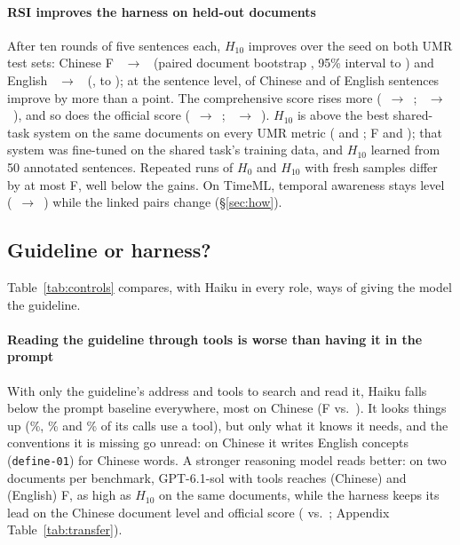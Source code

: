 \paragraph{RSI improves the harness on held-out documents} After ten rounds of five sentences each, $H_{10}$ improves over the seed on both UMR test sets: Chinese F \mainSeedZh{}~$\rightarrow$~\mainLearnedZh{} (paired document bootstrap \gainLearnedZh{}, 95\% interval \gainLearnedZhLo{} to \gainLearnedZhHi{}) and English \mainSeedEn{}~$\rightarrow$~\mainLearnedEn{} (\gainLearnedEn{}, \gainLearnedEnLo{} to \gainLearnedEnHi{}); at the sentence level, \sentLearnedZhBetter{} of \sentLearnedZhN{} Chinese and \sentLearnedEnBetter{} of \sentLearnedEnN{} English sentences improve by more than a point. The comprehensive score rises more (\compSeedZh{}~$\rightarrow$~\compLearnedZh{}; \compSeedEn{}~$\rightarrow$~\compLearnedEn{}), and so does the official \jumach{} score (\jumachSeedZh{}~$\rightarrow$~\jumachLearnedZh{}; \jumachSeedEn{}~$\rightarrow$~\jumachLearnedEn{}). $H_{10}$ is above the best shared-task system on the same documents on every UMR metric (\jumach{} \sotaJumachZh{} and \sotaJumachEn{}; F \sotaFZh{} and \sotaFEn{}); that system was fine-tuned on the shared task's training data, and $H_{10}$ learned from 50 annotated sentences. Repeated runs of $H_0$ and $H_{10}$ with fresh samples differ by at most \repDiffLearnedZh{} F, well below the gains. On TimeML, temporal awareness stays level (\mainSeedTml{}~$\rightarrow$~\mainLearnedTml{}) while the linked pairs change (\S\ref{sec:how}).

\subsection{Guideline or harness?}
\label{sec:controls}



Table~\ref{tab:controls} compares, with Haiku in every role, ways of giving the model the guideline.

\paragraph{Reading the guideline through tools is worse than having it in the prompt} With only the guideline's address and tools to search and read it, Haiku falls below the prompt baseline everywhere, most on Chinese (F \ctlToolsZh{} vs.\ \ctlPromptZh{}). It looks things up (\ctlToolUseZh\%, \ctlToolUseEn\% and \ctlToolUseTml\% of its calls use a tool), but only what it knows it needs, and the conventions it is missing go unread: on Chinese it writes English concepts (\texttt{define-01}) for Chinese words. A stronger reasoning model reads better: on two documents per benchmark, GPT-6.1-sol with tools reaches \subGptToolsZh{} (Chinese) and \subGptToolsEn{} (English) F, as high as $H_{10}$ on the same documents, while the harness keeps its lead on the Chinese document level and official score (\jumach{} \subLearnedHHJumachZh{} vs.\ \subGptToolsJumachZh{}; Appendix Table~\ref{tab:transfer}).

